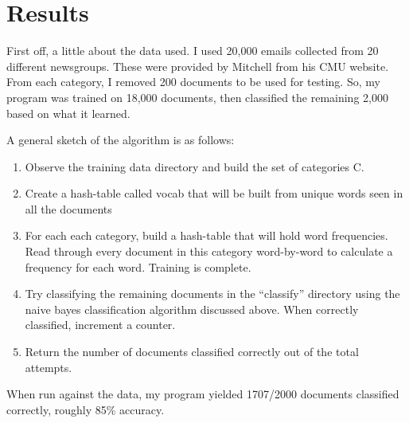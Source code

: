 \documentclass[a4paper,12pt]{article}
\newenvironment{ind}[1]%
{\begin{list}{}%
         {\setlength{\leftmargin}{#1}}%
       \item[]%
}
{\end{list}}
\begin{document}
\section*{Results}

\begin{enumerate}[]
  \item First off, a little about the data used. I used 20,000 emails
    collected from 20 different newsgroups. These were provided
    by Mitchell from his CMU website. From each category, I removed
    200 documents to be used for testing. So, my program was trained
    on 18,000 documents, then classified the remaining 2,000 based on
    what it learned.
    
  \item A general sketch of the algorithm is as follows: 
    \begin{ind}{0.5in}
      \begin{enumerate}[1)]
        \item Observe the training data directory and build the set of
          categories C.
        \item Create a hash-table called vocab that will be built from
          unique words seen in all the documents
        \item For each each category, build a hash-table that will
          hold word frequencies. Read through every document in this
          category word-by-word to calculate a frequency for each
          word. Training is complete.
        \item Try classifying the remaining documents in the
          ``classify'' directory using the naive bayes classification
          algorithm discussed above. When correctly classified,
          increment a counter.
        \item Return the number of documents classified correctly out
          of the total attempts.
          
      \end{enumerate}
    \end{ind}

  \item When run against the data, my program yielded 1707/2000
    documents classified correctly, roughly 85\% accuracy.
  
\end{enumerate}
\end{document}
